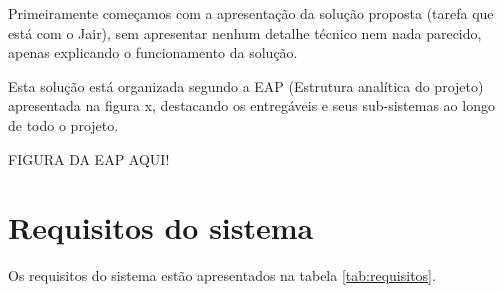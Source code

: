 Primeiramente começamos com a apresentação da solução proposta (tarefa que está com o Jair), sem apresentar nenhum detalhe técnico nem nada parecido, apenas explicando o funcionamento da solução. 

Esta solução está organizada segundo a EAP (Estrutura analítica do projeto) apresentada na figura x, destacando os entregáveis e seus sub-sistemas ao longo de todo o projeto.

FIGURA DA EAP AQUI!

\section{Requisitos do sistema} %
\label{sub:requisitos_do_sistema}

Os requisitos do sistema estão apresentados na tabela \ref{tab:requisitos}.

